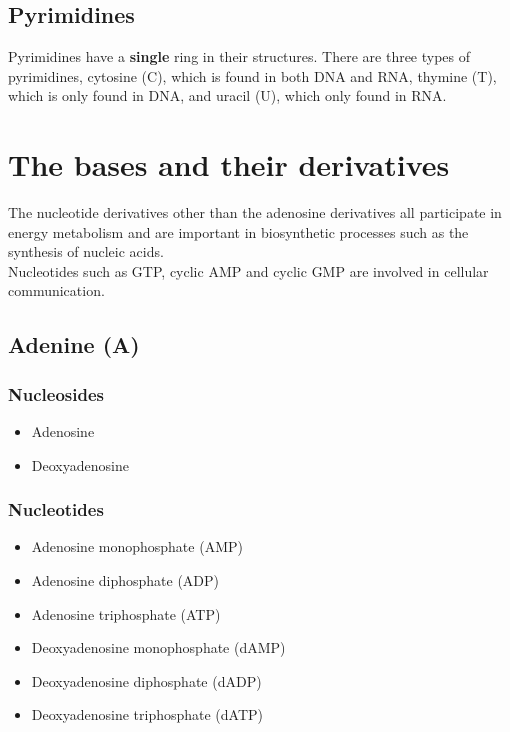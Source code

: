 \documentclass[11pt]{article}
\begin{document}
\subsection{Pyrimidines}
\label{sec:orgc0333de}
Pyrimidines have a \textbf{single} ring in their structures. There are three types of pyrimidines, cytosine (C), which is found in both DNA and RNA, thymine (T), which is only found in DNA, and uracil (U), which only found in RNA.

\newpage

\section{The bases and their derivatives}
\label{sec:org90f5e3f}
The nucleotide derivatives other than the adenosine derivatives all participate in energy metabolism and are important in biosynthetic processes such as the synthesis of nucleic acids.
\\[0pt]

Nucleotides such as GTP, cyclic AMP and cyclic GMP are involved in cellular communication.

\subsection{Adenine (A)}
\label{sec:orgf17dfc3}

\subsubsection{Nucleosides}
\label{sec:org2faf837}
\begin{itemize}
\item Adenosine
\item Deoxyadenosine
\end{itemize}

\subsubsection{Nucleotides}
\label{sec:orge458ed7}
\begin{itemize}
\item Adenosine monophosphate (AMP)
\item Adenosine diphosphate (ADP)
\item Adenosine triphosphate (ATP)
\item Deoxyadenosine monophosphate (dAMP)
\item Deoxyadenosine diphosphate (dADP)
\item Deoxyadenosine triphosphate (dATP)
\end{itemize}
\end{document}
